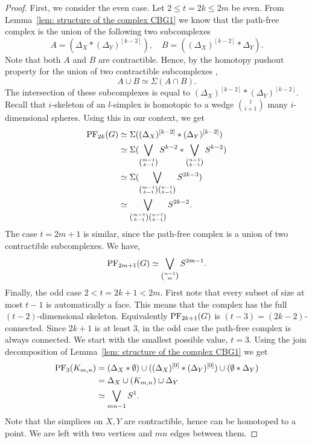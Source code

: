 \documentclass[12pt,reqno]{amsart}
\theoremstyle{definition}
\newcommand{\PF}{{\rm PF}}
\begin{document}
\begin{proof} First, we consider the even case. 
Let $2\leq t=2k\leq 2m$ be even. 
From Lemma~\ref{lem: structure of the complex CBG1} we know that the path-free complex is the union of the following two subcomplexes 
\[
    A =  (\Delta_X * (\Delta_{Y})^{[k-2]}),
    \quad
    B = ((\Delta_X)^{[k-2]} * \Delta_Y).
\]
Note that both $ A$ and $ B$ are contractible. 
Hence, by the homotopy pushout property for the union of two contractible subcomplexes \cite[Section 15.2]{kozlov2007},
\[A \cup B \simeq \Sigma (A \cap B). \]
The intersection of these subcomplexes is equal to
$(\Delta_X)^{[k-2]}\ast (\Delta_Y)^{[k-2]}. $
Recall that $i$-skeleton of an $l$-simplex is homotopic to a wedge $\binom{l}{i+1}$ many $i$-dimensional spheres. 
Using this in our context, we get
\begin{align*}
    \PF_{2k}(G) &\simeq \Sigma((\Delta_X)^{[k-2]}\ast (\Delta_Y)^{[k-2]})\\
        &\simeq \Sigma(\bigvee_{\binom{m-1}{k-1}} S^{k-2}\ast \bigvee_{\binom{n-1}{k-1}}S^{k-2}) \\
        &\simeq \Sigma(\bigvee_{\binom{m-1}{k-1}\binom{n-1}{k-1}} S^{2k-3})\\
        &\simeq \bigvee_{\binom{m-1}{k-1}\binom{n-1}{k-1}} S^{2k-2}.
\end{align*}
The case $t=2m+1$ is similar, since the path-free complex is a union of two contractible subcomplexes.  
We have,
    \[
    \PF_{2m+1}(G)
    \simeq
    \bigvee_{\binom{n-1}{m}} S^{2m-1}.
    \]
Finally, the odd case $2  < t = 2k+1 < 2m $. 
First note that every subset of size at most $t-1$ is automatically a face.
This means that the complex has the full $(t-2)$-dimensional skeleton.
Equivalently $\PF_{2k+1}(G)$ is $(t-3) = (2k-2)$-connected. 
Since $2k+1$ is at least $3$, in the odd case the path-free complex is always connected. 
We start with the smallest possible value, $t=3$. 
Using the join decomposition of Lemma~\ref{lem: structure of the complex CBG1} we get
\begin{align*}
    \PF_3(K_{m,n}) &= (\Delta_X\ast\emptyset)\cup((\Delta_X)^{[0]}\ast(\Delta_Y)^{[0]})\cup (\emptyset\ast\Delta_Y) \\
    &= \Delta_X \cup (K_{m,n}) \cup \Delta_Y\\
    &\simeq \bigvee_{mn-1} S^1. 
\end{align*}
Note that the simplices on $X, Y$ are contractible, hence can be homotoped to a point. 
We are left with two vertices and $mn$ edges between them. 


\end{proof}
\end{document}
